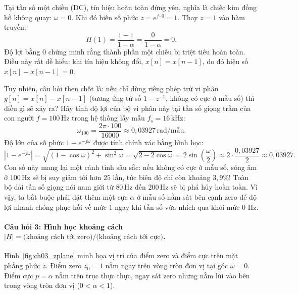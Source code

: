 Tại tần số một chiều (DC), tín hiệu hoàn toàn đứng yên, nghĩa là chiếc kim đồng hồ không quay: $\omega = 0$. Khi đó biến số phức $z = e^{j\cdot 0} = 1$. Thay $z = 1$ vào hàm truyền:
\begin{equation}
H(1) = \frac{1 - 1}{1 - \alpha} = \frac{0}{1 - \alpha} = 0.
\end{equation}
Độ lợi bằng 0 chứng minh rằng thành phần một chiều bị triệt tiêu hoàn toàn. Điều này rất dễ hiểu: khi tín hiệu không đổi, $x[n] = x[n-1]$, do đó hiệu số $x[n] - x[n-1] = 0$.

Tuy nhiên, câu hỏi then chốt là: nếu chỉ dùng riêng phép trừ vi phân $y[n] = x[n] - x[n-1]$ (tương ứng tử số $1 - z^{-1}$, không có cực ở mẫu số) thì điều gì sẽ xảy ra? Hãy tính độ lợi của bộ vi phân này tại tần số giọng trầm của con người $f = 100\,\text{Hz}$ trong hệ thống lấy mẫu $f_s = 16\,\text{kHz}$:
\begin{equation}
\omega_{100} = \frac{2\pi\cdot 100}{16000} \approx 0{,}03927\,\text{rad/mẫu}.
\end{equation}
Độ lớn của số phức $1 - e^{-j\omega}$ được tính chính xác bằng hình học:
\begin{equation}
|1 - e^{-j\omega}| = \sqrt{(1 - \cos\omega)^2 + \sin^2\omega} = \sqrt{2 - 2\cos\omega} = 2\sin\left(\frac{\omega}{2}\right) \approx 2\cdot\frac{0{,}03927}{2} \approx 0{,}03927.
\end{equation}
Con số này mang lại một cảnh tỉnh sâu sắc: nếu không có cực ở mẫu số, sóng âm ở $100\,\text{Hz}$ sẽ bị suy giảm tới hơn $25$ lần, tức biên độ chỉ còn khoảng $3{,}9\%$! Toàn bộ dải tần số giọng nói nam giới từ $80\,\text{Hz}$ đến $200\,\text{Hz}$ sẽ bị phá hủy hoàn toàn. Vì vậy, ta bắt buộc phải đặt thêm một cực $\alpha$ ở mẫu số nằm sát bên cạnh zero để độ lợi nhanh chóng phục hồi về mức 1 ngay khi tần số vừa nhích qua khỏi mức 0 Hz.

\paragraph{Câu hỏi 3: Hình học khoảng cách $|H| = \text{(khoảng cách tới zero)} / \text{(khoảng cách tới cực)}$.}
Hình~\ref{fig:ch03_zplane} minh họa vị trí của điểm zero và điểm cực trên mặt phẳng phức $z$. Điểm zero $z_0 = 1$ nằm ngay trên vòng tròn đơn vị tại góc $\omega = 0$. Điểm cực $p = \alpha$ nằm trên trục thực thực, ngay sát zero nhưng nằm lùi vào bên trong vòng tròn đơn vị ($0 < \alpha < 1$).

